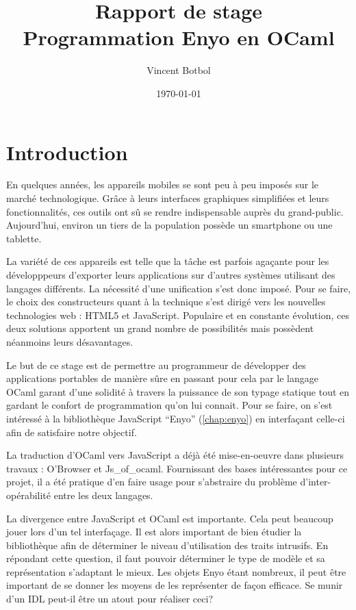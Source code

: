 \documentclass[11pt,a4paper]{report}
\title{Rapport de stage\\Programmation Enyo en OCaml}
\author{Vincent Botbol}
\date\today
\begin{document}
\maketitle

\chapter{Introduction}

En quelques années, les appareils mobiles se sont peu à peu imposés sur le marché technologique.
Grâce à leurs interfaces graphiques simplifiées et leurs fonctionnalités, ces outils ont sû se 
rendre indispensable auprès du grand-public.
Aujourd'hui, environ un tiers de la population possède un smartphone ou une tablette.

La variété de ces appareils est telle que la tâche est parfois agaçante pour les développpeurs 
d'exporter leurs applications sur d'autres systèmes utilisant des langages différents.
La nécessité d'une unification s'est donc imposé. Pour se faire, le choix des constructeurs quant à
la technique s'est dirigé vers les nouvelles technologies web :
HTML5 et JavaScript. Populaire et en constante évolution, ces deux solutions apportent un grand nombre
de possibilités mais possèdent néanmoins leurs désavantages.

Le but de ce stage est de permettre au programmeur de développer des applications portables de manière sûre
en passant pour cela par le langage OCaml garant d'une solidité à travers la puissance de son typage statique
tout en gardant le confort de programmation qu'on lui connait.
Pour se faire, on s'est intéressé à la bibliothèque JavaScript ``Enyo'' (\ref{chap:enyo}) 
en interfaçant celle-ci afin de satisfaire notre objectif.

La traduction d'OCaml vers JavaScript a déjà été mise-en-oeuvre dans plusieurs travaux : O'Browser
et Js\_of\_ocaml. Fournissant des bases intéressantes pour ce projet, il a été pratique d'en faire usage
pour s'abstraire du problème d'inter-opérabilité entre les deux langages.

La divergence entre JavaScript et OCaml est importante. Cela peut beaucoup jouer lors d'un tel 
interfaçage. Il est alors important de bien étudier la bibliothèque afin de déterminer le niveau
d'utilisation des traits intrusifs.
En répondant cette question, il faut pouvoir déterminer le type de modèle et sa représentation
s'adaptant le mieux.
Les objets Enyo étant nombreux, il peut être important de se donner les moyens de les représenter 
de façon efficace. Se munir d'un IDL peut-il être un atout pour réaliser ceci?
\end{document}
